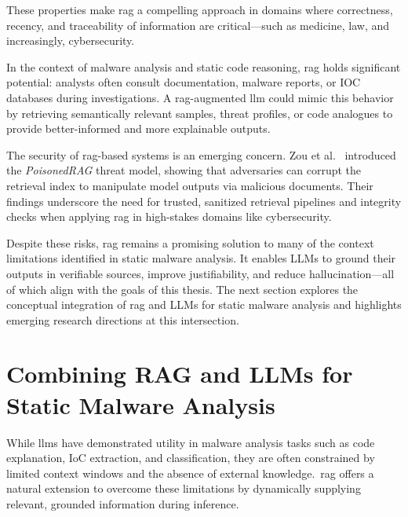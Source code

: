 These properties make \gls{rag} a compelling approach in domains where correctness, recency, and
traceability of information are critical—such as medicine, law, and increasingly, cybersecurity.

In the context of malware analysis and static code reasoning, \gls{rag} holds significant
potential: analysts often consult documentation, malware reports, or IOC databases during
investigations. A \gls{rag}-augmented \gls{llm} could mimic this behavior by retrieving
semantically relevant samples, threat profiles, or code analogues to provide better-informed and
more explainable outputs.

The security of \gls{rag}-based systems is an emerging concern. Zou et
al.~\cite{zou2024poisonedrag} introduced the \textit{PoisonedRAG} threat model, showing that
adversaries can corrupt the retrieval index to manipulate model outputs via malicious documents.
Their findings underscore the need for trusted, sanitized retrieval pipelines and integrity checks
when applying \gls{rag} in high-stakes domains like cybersecurity.

Despite these risks, \gls{rag} remains a promising solution to many of the context limitations
identified in static malware analysis. It enables \gls{LLMs} to ground their outputs in verifiable
sources, improve justifiability, and reduce hallucination—all of which align with the goals of this
thesis. The next section explores the conceptual integration of \gls{rag} and \gls{LLMs} for static
malware analysis and highlights emerging research directions at this intersection.

\section{Combining RAG and LLMs for Static Malware Analysis}\label{sec:CombiningRAGAndLLM}
While \glspl{llm} have demonstrated utility in malware analysis tasks such as code explanation, IoC
extraction, and classification, they are often constrained by limited context windows and the
absence of external knowledge.\ \gls{rag} offers a natural extension to overcome these limitations
by dynamically supplying relevant, grounded information during inference.

